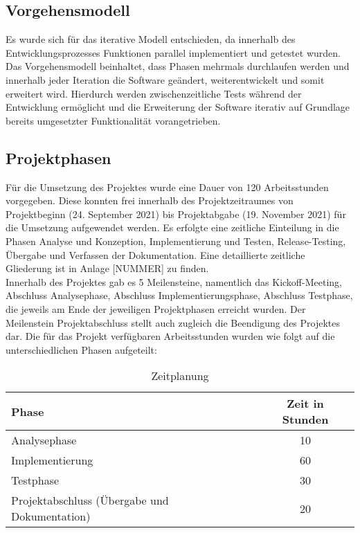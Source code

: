 \subsection{Vorgehensmodell}
    Es wurde sich für das iterative Modell entschieden, da innerhalb des Entwicklungsprozesses Funktionen parallel implementiert und getestet wurden.\\
    Das Vorgehensmodell beinhaltet, dass Phasen mehrmals durchlaufen werden und innerhalb jeder Iteration die Software geändert, weiterentwickelt und somit erweitert wird. Hierdurch werden zwischenzeitliche Tests während der Entwicklung ermöglicht und die Erweiterung der Software iterativ auf Grundlage bereits umgesetzter Funktionalität vorangetrieben.

\subsection{Projektphasen}
    Für die Umsetzung des Projektes wurde eine Dauer von 120 Arbeitsstunden vorgegeben. Diese konnten frei innerhalb des Projektzeitraumes von Projektbeginn (24. September 2021) bis Projektabgabe (19. November 2021) für die Umsetzung aufgewendet werden. Es erfolgte eine zeitliche Einteilung in die Phasen Analyse und Konzeption, Implementierung und Testen, Release-Testing, Übergabe und Verfassen der Dokumentation. Eine detaillierte zeitliche Gliederung ist in Anlage [NUMMER] zu finden.\\
    Innerhalb des Projektes gab es 5 Meilensteine, namentlich das \glqq Kickoff-Meeting\grqq{}, \glqq Abschluss Analysephase\grqq{}, \glqq Abschluss Implementierungsphase\grqq{}, \glqq Abschluss Testphase\grqq{}, die jeweils am Ende der jeweiligen Projektphasen erreicht wurden. Der Meilenstein \glqq Projektabschluss\grqq{} stellt auch zugleich die Beendigung des Projektes dar. Die für das Projekt verfügbaren Arbeitsstunden wurden wie folgt auf die unterschiedlichen Phasen aufgeteilt:\\

    \begin{table}[h]
        \centering
        \begin{tabular}{l|c}
            Phase & Zeit in Stunden \\
            \hline
            Analysephase & 10 \\
            Implementierung & 60 \\
            Testphase & 30 \\
            Projektabschluss (Übergabe und Dokumentation) & 20
        \end{tabular}
        \caption{Zeitplanung}
    \end{table}

